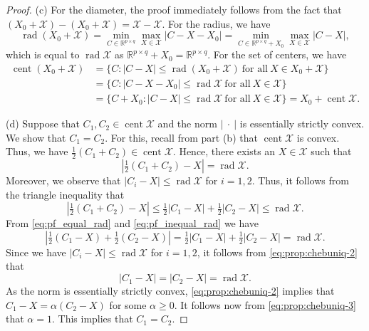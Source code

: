 \documentclass[10pt,a4paper]{amsart}
\DeclareMathOperator{\cent}{cent}
\DeclareMathOperator{\rad}{rad}
\newcommand{\norm}[1]{\left|#1\right|}
\begin{document}
\begin{proof}
(c) For the diameter, the proof immediately follows from the fact that \mbox{$(X_0+\mathcal{X})-(X_0+\mathcal{X})=\mathcal{X}-\mathcal{X}$}. For the radius, we have
\begin{equation}
\rad (X_0+\mathcal{X})= \min_{C\in\mathbb{R}^{p\times q}} \max_{X\in\mathcal{X}} \norm{C-X-X_0}=\min_{C\in\mathbb{R}^{p\times q}+X_0} \max_{X\in\mathcal{X}} \norm{C-X},
\end{equation}
which is equal to $\rad \mathcal{X}$ as $\mathbb{R}^{p\times q}+X_0=\mathbb{R}^{p\times q}$. For the set of centers, we have 
\begin{equation}
\begin{split}
\cent(X_0+\mathcal{X})&=\{C:\norm{C-X}\leq\rad(X_0+\mathcal{X}) \ \text{for all}\  X\in X_0+\mathcal{X}\} \\
&= \{C:\norm{C-X-X_0}\leq\rad\mathcal{X} \ \text{for all}\  X\in\mathcal{X}\}\\
&=\{C+X_0:\norm{C-X}\leq\rad\mathcal{X} \ \text{for all}\   X\in\mathcal{X}\}=X_0+\cent\mathcal{X}.
\end{split}
\end{equation}

(d) Suppose that $C_1,C_2\in\cent\mathcal{X}$ and the norm $\norm{\ \cdot\ }$ is essentially strictly convex. We show that $C_1=C_2$. For this, recall from part (b) that $\cent\mathcal{X}$ is convex. Thus, we have $\tfrac{1}{2}(C_1+C_2)\in\cent\mathcal{X}$. Hence, there exists an $X\in\mathcal{X}$ such that
\begin{equation}
\label{eq:pf_equal_rad}
\norm{\tfrac{1}{2}(C_1+C_2)-X}=\rad\mathcal{X}.
\end{equation}
Moreover, we observe that $\norm{C_i-X}\leq\rad\mathcal{X}$ for $i=1,2$. Thus, it follows from the triangle inequality that
\begin{equation}
\label{eq:pf_inequal_rad}
\norm{\tfrac{1}{2}(C_1+C_2)-X}\leq\tfrac{1}{2}\norm{C_1-X}+\tfrac{1}{2}\norm{C_2-X}\leq\rad\mathcal{X}.
\end{equation}
From \eqref{eq:pf_equal_rad} and \eqref{eq:pf_inequal_rad} we have
\begin{equation}
\label{eq:prop:chebuniq-2}
\norm{\tfrac{1}{2}(C_1-X)+\tfrac{1}{2}(C_2-X)}=\tfrac{1}{2}\norm{C_1-X}+\tfrac{1}{2}\norm{C_2-X}=\rad\mathcal{X}.
\end{equation}
Since we have $\norm{C_i-X}\leq\rad\mathcal{X}$ for $i=1,2$, it follows from \eqref{eq:prop:chebuniq-2} that 
\begin{equation}
\label{eq:prop:chebuniq-3}
\norm{C_1-X}=\norm{C_2-X}=\rad\mathcal{X}.
\end{equation}
As the norm is essentially strictly convex, \eqref{eq:prop:chebuniq-2} implies that $C_1-X=\alpha(C_2-X)$ for some $\alpha\geq 0$. It follows now from \eqref{eq:prop:chebuniq-3} that $\alpha=1$. This implies that $C_1=C_2$.
\end{proof}
\end{document}
